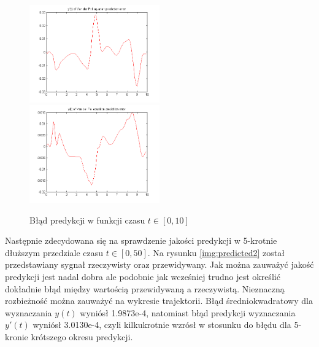 \begin{figure}[ht!]
	\centering

	\subfloat
	{\includegraphics[width=0.5\textwidth]
	{images/err100_x1.png}}
	\subfloat
	{\includegraphics[width=0.5\textwidth]
	{images/err100_x2.png}}	
	

	\caption{Błąd predykcji w funkcji czasu $t \in [0,10]$}
	\label{img:err}
\end{figure}


Następnie zdecydowana się na sprawdzenie jakości predykcji w 5-krotnie dłuższym przedziale czasu $t \in [0, 50]$. Na rysunku \ref{img:predicted2} został przedstawiany sygnał rzeczywisty oraz przewidywany. Jak można zauważyć jakość predykcji jest nadal dobra ale podobnie jak wcześniej trudno jest określić dokładnie błąd między wartością przewidywaną a rzeczywistą. Nieznaczną rozbieżność można zauważyć na wykresie trajektorii. Błąd średniokwadratowy dla wyznaczania $y(t)$ wyniósł  1.9873e-4, natomiast błąd predykcji wyznaczania $y'(t)$ wyniósł 3.0130e-4, czyli kilkukrotnie wzrósł w stosunku do błędu dla 5-kronie krótszego okresu predykcji.

